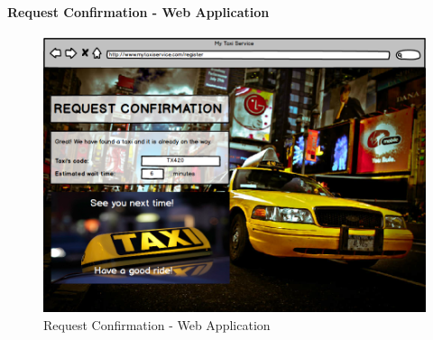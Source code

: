 		\paragraph{Request Confirmation - Web Application}
		\begin{figure}[!h]
			\begin{center}
				\includegraphics[scale=0.45]{../SE2_MOCKUPS/WebAppRequestConfirmation.png}
				\caption{Request Confirmation - Web Application}
			\end{center}	
		\end{figure}
		\newpage
